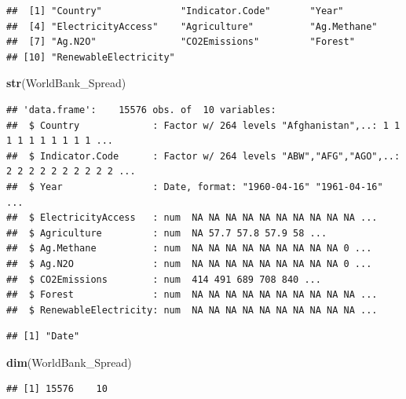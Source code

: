 \documentclass[12pt,]{article}
\newenvironment{Shaded}{\begin{snugshade}}{\end{snugshade}}
\newcommand{\KeywordTok}[1]{\textcolor[rgb]{0.13,0.29,0.53}{\textbf{#1}}}
\newcommand{\OperatorTok}[1]{\textcolor[rgb]{0.81,0.36,0.00}{\textbf{#1}}}
\newcommand{\NormalTok}[1]{#1}
\begin{document}
\begin{verbatim}
##  [1] "Country"              "Indicator.Code"       "Year"                
##  [4] "ElectricityAccess"    "Agriculture"          "Ag.Methane"          
##  [7] "Ag.N2O"               "CO2Emissions"         "Forest"              
## [10] "RenewableElectricity"
\end{verbatim}

\begin{Shaded}
\begin{Highlighting}[]
\KeywordTok{str}\NormalTok{(WorldBank_Spread)}
\end{Highlighting}
\end{Shaded}

\begin{verbatim}
## 'data.frame':    15576 obs. of  10 variables:
##  $ Country             : Factor w/ 264 levels "Afghanistan",..: 1 1 1 1 1 1 1 1 1 1 ...
##  $ Indicator.Code      : Factor w/ 264 levels "ABW","AFG","AGO",..: 2 2 2 2 2 2 2 2 2 2 ...
##  $ Year                : Date, format: "1960-04-16" "1961-04-16" ...
##  $ ElectricityAccess   : num  NA NA NA NA NA NA NA NA NA NA ...
##  $ Agriculture         : num  NA 57.7 57.8 57.9 58 ...
##  $ Ag.Methane          : num  NA NA NA NA NA NA NA NA NA 0 ...
##  $ Ag.N2O              : num  NA NA NA NA NA NA NA NA NA 0 ...
##  $ CO2Emissions        : num  414 491 689 708 840 ...
##  $ Forest              : num  NA NA NA NA NA NA NA NA NA NA ...
##  $ RenewableElectricity: num  NA NA NA NA NA NA NA NA NA NA ...
\end{verbatim}

\begin{Shaded}
\end{Shaded}

\begin{verbatim}
## [1] "Date"
\end{verbatim}

\begin{Shaded}
\begin{Highlighting}[]
\KeywordTok{dim}\NormalTok{(WorldBank_Spread)}
\end{Highlighting}
\end{Shaded}

\begin{verbatim}
## [1] 15576    10
\end{verbatim}
\end{document}
